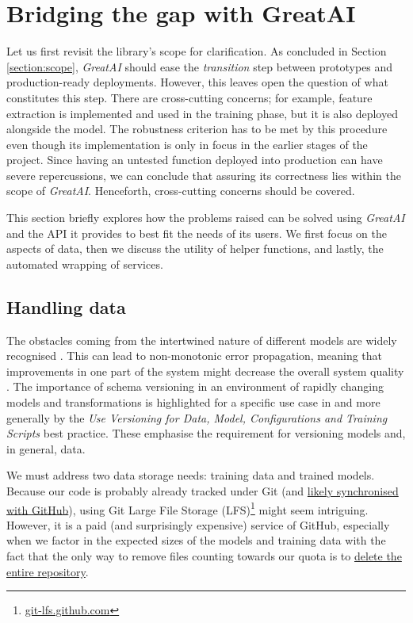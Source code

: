 \section{Bridging the gap with GreatAI}

Let us first revisit the library's scope for clarification. As concluded in Section \ref{section:scope}, \textit{GreatAI} should ease the \textit{transition} step between prototypes and production-ready deployments. However, this leaves open the question of what constitutes this step. There are cross-cutting concerns; for example, feature extraction is implemented and used in the training phase, but it is also deployed alongside the model. The robustness criterion has to be met by this procedure even though its implementation is only in focus in the earlier stages of the project. Since having an untested function deployed into production can have severe repercussions, we can conclude that assuring its correctness lies within the scope of \textit{GreatAI}. Henceforth, cross-cutting concerns should be covered.

This section briefly explores how the problems raised can be solved using \textit{GreatAI} and the API it provides to best fit the needs of its users. We first focus on the aspects of data, then we discuss the utility of helper functions, and lastly, the automated wrapping of services.

\subsection{Handling data} \label{subsection:large-file}

The obstacles coming from the intertwined nature of different models are widely recognised \cite{haakman2021ai,amershi2019software,sculley2015hidden}. This can lead to non-monotonic error propagation, meaning that improvements in one part of the system might decrease the overall system quality \cite{amershi2019software}. The importance of schema versioning in an environment of rapidly changing models and transformations is highlighted for a specific use case in \cite{van2017versioning} and more generally by the \textit{Use Versioning for Data, Model, Configurations and Training Scripts} best practice. These emphasise the requirement for versioning models and, in general, data.

We must address two data storage needs: training data and trained models. Because our code is probably already tracked under Git (and \href{https://octoverse.github.com/#lets-look-back-at-the-code-and-communities-built-on-git-hub-this-year}{likely synchronised with GitHub}), using Git Large File Storage (LFS)\footnote{\href{https://git-lfs.github.com/}{git-lfs.github.com}} might seem intriguing. However, it is a paid (and surprisingly expensive) service of GitHub, especially when we factor in the expected sizes of the models and training data with the fact that the only way to remove files counting towards our quota is to \href{https://docs.github.com/en/repositories/working-with-files/managing-large-files/removing-files-from-git-large-file-storage#git-lfs-objects-in-your-repository}{delete the entire repository}.

